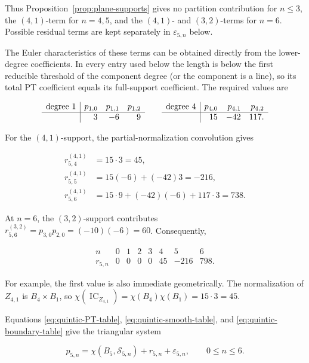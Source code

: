 \documentclass[11pt,reqno]{amsart}
\theoremstyle{definition}
\newcommand{\IC}{\operatorname{IC}}
\begin{document}
Thus Proposition~\ref{prop:plane-supports} gives no partition contribution
for $n\le3$, the $(4,1)$-term for $n=4,5$, and the $(4,1)$- and
$(3,2)$-terms for $n=6$.  Possible residual terms are kept separately in
$\varepsilon_{5,n}$ below.

The Euler characteristics of these terms can be obtained directly from the
lower-degree coefficients.  In every entry used below the length is below the
first reducible threshold of the component degree (or the component is a
line), so its total PT coefficient equals its full-support coefficient.  The
required values are

\[
\begin{array}{c|rrr}
\text{degree }1&p_{1,0}&p_{1,1}&p_{1,2}\\ \hline
&3&-6&9
\end{array}
\qquad
\begin{array}{c|rrr}
\text{degree }4&p_{4,0}&p_{4,1}&p_{4,2}\\ \hline
&15&-42&117.
\end{array}
\]

For the $(4,1)$-support, the partial-normalization convolution gives

\begin{align*}
 r_{5,4}^{(4,1)}&=15\cdot3=45,\\
 r_{5,5}^{(4,1)}&=15(-6)+(-42)3=-216,\\
 r_{5,6}^{(4,1)}&=15\cdot9+(-42)(-6)+117\cdot3=738.
\end{align*}

At $n=6$, the $(3,2)$-support contributes
$r_{5,6}^{(3,2)}=p_{3,0}p_{2,0}=(-10)(-6)=60$.  Consequently,

\begin{equation}\label{eq:quintic-boundary-table}
\begin{array}{c|rrrrrrr}
n&0&1&2&3&4&5&6\\ \hline
r_{5,n}&0&0&0&0&45&-216&798.
\end{array}
\end{equation}

For example, the first value is also immediate geometrically.  The
normalization of $Z_{4,1}$ is $B_4\times B_1$, so
$\chi(\IC_{Z_{4,1}})=\chi(B_4)\chi(B_1)=15\cdot3=45$.

Equations \eqref{eq:quintic-PT-table},
\eqref{eq:quintic-smooth-table}, and
\eqref{eq:quintic-boundary-table} give the triangular system

\begin{equation}\label{eq:quintic-triangular-system}
  p_{5,n}
  =\chi(B_5,\mathcal S_{5,n})+r_{5,n}+\varepsilon_{5,n},
  \qquad 0\le n\le6.
\end{equation}
\end{document}
